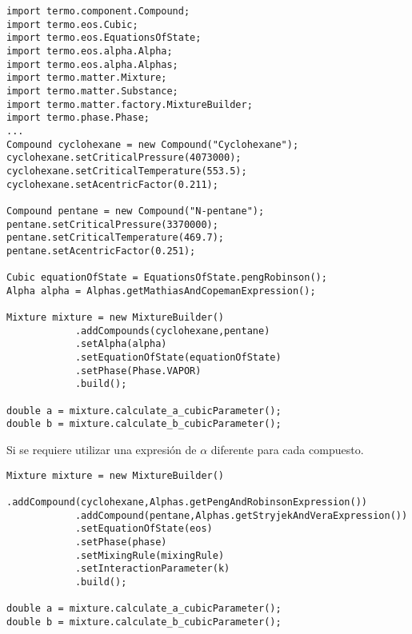 \begin{lstlisting}[caption=Código para el cálculo de los parámetros de la ecuación de estado en una mezcla. ]
import termo.component.Compound;
import termo.eos.Cubic;
import termo.eos.EquationsOfState;
import termo.eos.alpha.Alpha;
import termo.eos.alpha.Alphas;
import termo.matter.Mixture;
import termo.matter.Substance;
import termo.matter.factory.MixtureBuilder;
import termo.phase.Phase;
...
Compound cyclohexane = new Compound("Cyclohexane");
cyclohexane.setCriticalPressure(4073000);
cyclohexane.setCriticalTemperature(553.5);
cyclohexane.setAcentricFactor(0.211);

Compound pentane = new Compound("N-pentane");
pentane.setCriticalPressure(3370000);
pentane.setCriticalTemperature(469.7);
pentane.setAcentricFactor(0.251);

Cubic equationOfState = EquationsOfState.pengRobinson();
Alpha alpha = Alphas.getMathiasAndCopemanExpression();

Mixture mixture = new MixtureBuilder()
			.addCompounds(cyclohexane,pentane)
			.setAlpha(alpha)
			.setEquationOfState(equationOfState)
			.setPhase(Phase.VAPOR)
			.build();

double a = mixture.calculate_a_cubicParameter();
double b = mixture.calculate_b_cubicParameter();
\end{lstlisting}


Si se requiere utilizar una expresión de $\alpha$ diferente para cada compuesto.
\begin{lstlisting}
Mixture mixture = new MixtureBuilder()
			.addCompound(cyclohexane,Alphas.getPengAndRobinsonExpression())
			.addCompound(pentane,Alphas.getStryjekAndVeraExpression())
			.setEquationOfState(eos)
			.setPhase(phase)
			.setMixingRule(mixingRule)
			.setInteractionParameter(k)
			.build();

double a = mixture.calculate_a_cubicParameter();
double b = mixture.calculate_b_cubicParameter();
\end{lstlisting}
